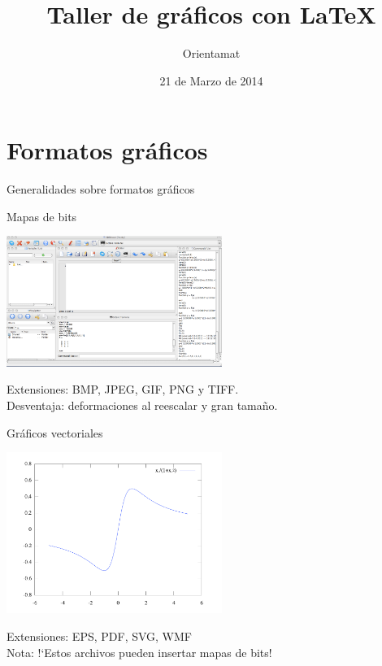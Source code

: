 \documentclass{beamer}
\title[Taller de \LaTeX]{Taller de gr\'aficos con \LaTeX}
\author[Los presentes]{Orientamat}
\institute[UGR]{Universidad de Granada}
\date{21 de Marzo de 2014}
\begin{document}
\maketitle

\section{Formatos gr\'aficos}
\begin{frame}{Generalidades sobre formatos gr\'aficos}
\begin{block}{Mapas de bits} 
\begin{center}
\includegraphics[width=7cm]{./graficos/QtOctave.pdf}
\end{center}
Extensiones: BMP, JPEG, GIF, PNG y TIFF. \\
{\small Desventaja: deformaciones al reescalar y gran tama\~no.}
\end{block}
\end{frame}
\begin{frame}
\begin{block} {Gr\'aficos vectoriales} 
\begin{center}
\includegraphics[width=7cm]{graficos/fplot.pdf}
\end{center}
Extensiones: EPS, PDF, SVG, WMF \\
{\small Nota: !`Estos archivos pueden insertar mapas de bits! }
\end{block}
\end{frame}

\end{document}
